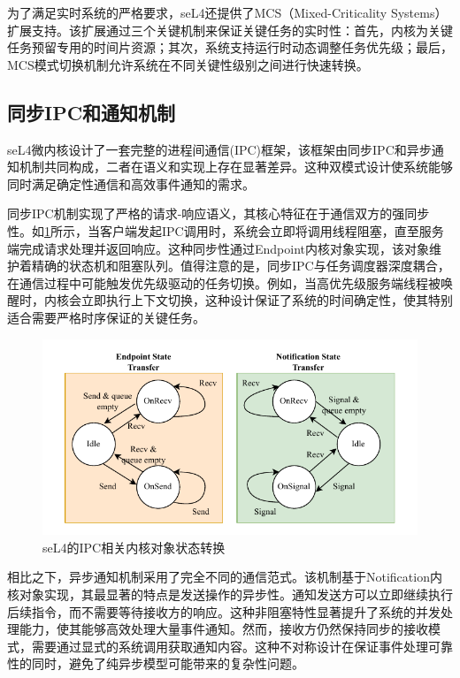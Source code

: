 为了满足实时系统的严格要求，seL4还提供了MCS（Mixed-Criticality Systems）扩展支持。该扩展通过三个关键机制来保证关键任务的实时性：首先，内核为关键任务预留专用的时间片资源；其次，系统支持运行时动态调整任务优先级；最后，MCS模式切换机制允许系统在不同关键性级别之间进行快速转换。

\subsection{同步IPC和通知机制}
\label{sec:sel4_ipc}
seL4微内核设计了一套完整的进程间通信(IPC)框架，该框架由同步IPC和异步通知机制共同构成，二者在语义和实现上存在显著差异。这种双模式设计使系统能够同时满足确定性通信和高效事件通知的需求。


同步IPC机制实现了严格的请求-响应语义，其核心特征在于通信双方的强同步性。如\ref{fig:seL4_ipc_state}所示，当客户端发起IPC调用时，系统会立即将调用线程阻塞，直至服务端完成请求处理并返回响应。这种同步性通过Endpoint内核对象实现，该对象维护着精确的状态机和阻塞队列。值得注意的是，同步IPC与任务调度器深度耦合，在通信过程中可能触发优先级驱动的任务切换。例如，当高优先级服务端线程被唤醒时，内核会立即执行上下文切换，这种设计保证了系统的时间确定性，使其特别适合需要严格时序保证的关键任务。

\begin{figure}[htbp]
  \centering
  \includegraphics{figures/seL4_ipc_state.drawio.pdf}
  \caption{seL4的IPC相关内核对象状态转换}\label{fig:seL4_ipc_state}
\end{figure}

相比之下，异步通知机制采用了完全不同的通信范式。该机制基于Notification内核对象实现，其最显著的特点是发送操作的异步性。通知发送方可以立即继续执行后续指令，而不需要等待接收方的响应。这种非阻塞特性显著提升了系统的并发处理能力，使其能够高效处理大量事件通知。然而，接收方仍然保持同步的接收模式，需要通过显式的系统调用获取通知内容。这种不对称设计在保证事件处理可靠性的同时，避免了纯异步模型可能带来的复杂性问题。

